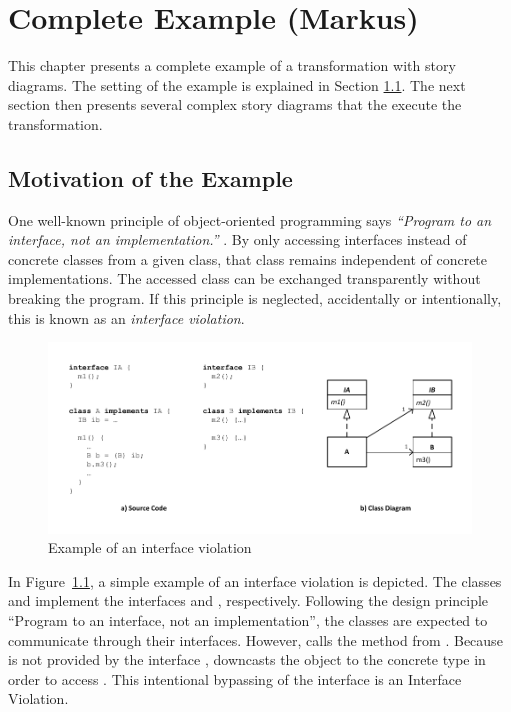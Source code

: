 \chapter{Complete Example (Markus)} \label{sec:Example}

This chapter presents a complete example of a transformation with story diagrams. The setting of the example is explained in Section \ref{sec:Example:Motivation}. The next section then presents several complex story diagrams that the execute the transformation.

\section{Motivation of the Example}
\label{sec:Example:Motivation}

One well-known principle of object-oriented programming says \emph{``Program to an interface, not an implementation.''} \cite{GHJV95}. By only accessing interfaces instead of concrete classes from a given class, that class remains independent of concrete implementations. The accessed class can be exchanged transparently without breaking the program. If this principle is neglected, accidentally or intentionally, this is known as an \emph{interface violation}.

\begin{figure}[hbtp]
\centering
\includegraphics[width=\linewidth]{./figures/InterfaceViolation}
\caption{Example of an interface violation}
\label{fig:InterfaceViolationExample}
\end{figure}

In Figure~\ref{fig:InterfaceViolationExample}, a simple example of an interface violation is depicted. The classes  and  implement the interfaces  and , respectively. Following the design principle ``Program to an interface, not an implementation'', the classes are expected to communicate through their interfaces. However,  calls the method  from . Because  is not provided by the interface ,  downcasts the object  to the concrete type  in order to access . This intentional bypassing of the interface  is an Interface Violation.

